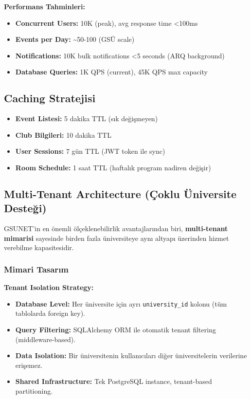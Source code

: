 \documentclass[a4paper,12pt]{report}
\begin{document}
\textbf{Performans Tahminleri:}

\begin{itemize}
    \item \textbf{Concurrent Users:} 10K (peak), avg response time <100ms
    \item \textbf{Events per Day:} \textasciitilde{}50-100 (GSÜ scale)
    \item \textbf{Notifications:} 10K bulk notifications <5 seconds (ARQ background)
    \item \textbf{Database Queries:} 1K QPS (current), 45K QPS max capacity
\end{itemize}

\subsection{Caching Stratejisi}

\begin{itemize}
    \item \textbf{Event Listesi:} 5 dakika TTL (sık değişmeyen)
    \item \textbf{Club Bilgileri:} 10 dakika TTL
    \item \textbf{User Sessions:} 7 gün TTL (JWT token ile sync)
    \item \textbf{Room Schedule:} 1 saat TTL (haftalık program nadiren değişir)
\end{itemize}

\subsection{Multi-Tenant Architecture (Çoklu Üniversite Desteği)}

GSUNET'in en önemli ölçeklenebilirlik avantajlarından biri, \textbf{multi-tenant mimarisi} sayesinde birden fazla üniversiteye aynı altyapı üzerinden hizmet verebilme kapasitesidir.

\subsubsection{Mimari Tasarım}

\textbf{Tenant Isolation Strategy:}

\begin{itemize}
    \item \textbf{Database Level:} Her üniversite için ayrı \texttt{university\_id} kolonu (tüm tablolarda foreign key).
    \item \textbf{Query Filtering:} SQLAlchemy ORM ile otomatik tenant filtering (middleware-based).
    \item \textbf{Data Isolation:} Bir üniversitenin kullanıcıları diğer üniversitelerin verilerine erişemez.
    \item \textbf{Shared Infrastructure:} Tek PostgreSQL instance, tenant-based partitioning.
\end{itemize}
\end{document}
